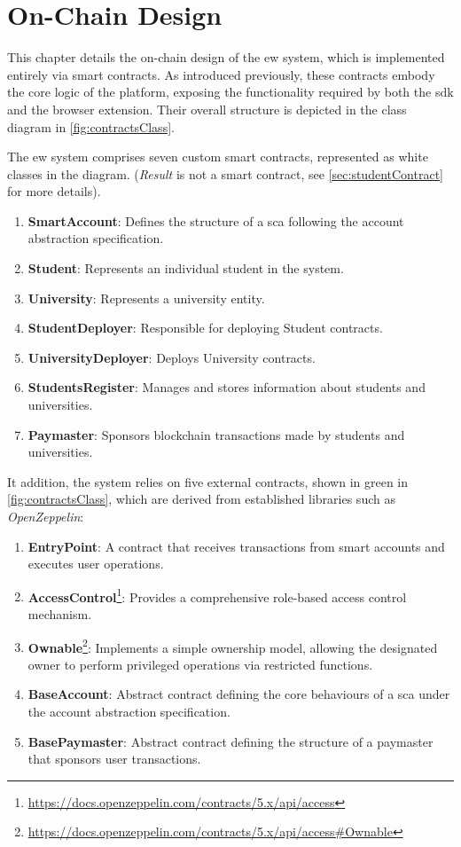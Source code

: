\chapter{On-Chain Design}
\label{chap:onchainDesign}
This chapter details the on-chain design of the \acrshort{ew} system, which is implemented entirely via smart contracts. As introduced previously, these contracts embody the core logic of the platform, exposing the functionality required by both the \acrshort{sdk} and the browser extension. Their overall structure is depicted in the class diagram in \cref{fig:contractsClass}. 

The \acrshort{ew} system comprises seven custom smart contracts, represented as white classes in the diagram. (\textit{Result} is not a smart contract, see \cref{sec:studentContract} for more details). 
\begin{enumerate}
    \item \textbf{SmartAccount}: Defines the structure of a \acrfull{sca} following the account abstraction specification.
    \item \textbf{Student}: Represents an individual student in the system.
    \item \textbf{University}: Represents a university entity.
    \item \textbf{StudentDeployer}: Responsible for deploying Student contracts.
    \item \textbf{UniversityDeployer}: Deploys University contracts.
    \item \textbf{StudentsRegister}: Manages and stores information about students and universities.
    \item \textbf{Paymaster}: Sponsors blockchain transactions made by students and universities.
\end{enumerate}
It addition, the system relies on five external contracts, shown in green in \cref{fig:contractsClass}, which are derived from established libraries such as \textit{OpenZeppelin}:
\begin{enumerate}
    \item \textbf{EntryPoint}: A contract that receives transactions from smart accounts and executes user operations.
    \item \textbf{AccessControl}\footnote{\url{https://docs.openzeppelin.com/contracts/5.x/api/access}}: Provides a comprehensive role-based access control mechanism.
    \item \textbf{Ownable}\footnote{\url{https://docs.openzeppelin.com/contracts/5.x/api/access\#Ownable}}: Implements a simple ownership model, allowing the designated owner to perform privileged operations via restricted functions.
    \item \textbf{BaseAccount}: Abstract contract defining the core behaviours of a \acrshort{sca} under the account abstraction specification.
    \item \textbf{BasePaymaster}: Abstract contract defining the structure of a paymaster that sponsors user transactions.
\end{enumerate}

